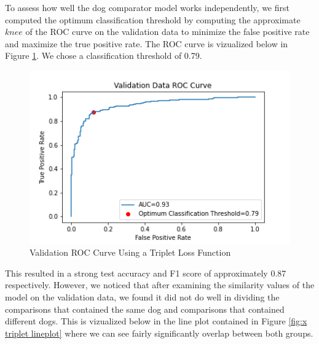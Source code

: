 \documentclass{article}
\begin{document}
To assess how well the dog comparator model works independently, we first computed the optimum classification threshold by computing the approximate $knee$ of the ROC curve on the validation data to minimize the false positive rate and maximize the true positive rate.  The ROC curve is vizualized below in Figure \ref{fig:x val roc curve}.  We chose a classification threshold of 0.79.

\begin{figure}[h]
\centering
	\includegraphics[scale=0.7]{final-report-images/roc_curve_validation_triplet.png}
\caption{Validation ROC Curve Using a Triplet Loss Function}
\label{fig:x val roc curve}
\end{figure}

\noindent This resulted in a strong test accuracy and F1 score of approximately 0.87 respectively.  However, we noticed that after examining the similarity values of the model on the validation data, we found it did not do well in dividing the comparisons that contained the same dog and comparisons that contained different dogs.  This is vizualized below in the line plot contained in Figure \ref{fig:x triplet lineplot} where we can see fairly significantly overlap between both groups.
\end{document}
